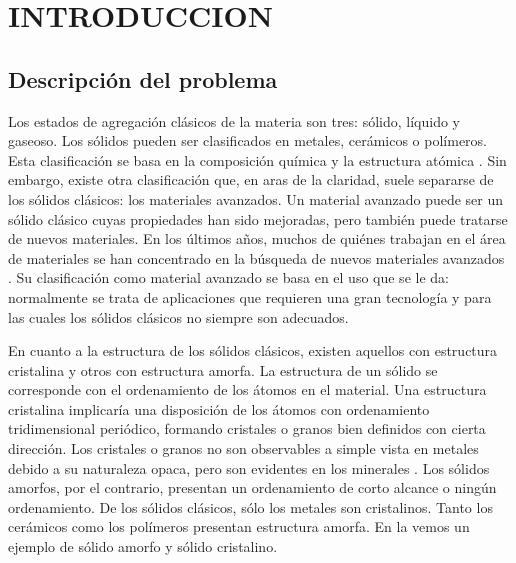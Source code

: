 
\chapter{INTRODUCCION} %

\label{C1} %



\section{Descripción del problema}
\label{S1_1}

Los estados de agregación clásicos de la materia son tres: sólido, líquido y gaseoso. Los sólidos pueden ser clasificados en metales, cerámicos o polímeros. Esta clasificación se basa en la composición química y la estructura atómica \citep{callister95}. Sin embargo, existe otra clasificación que, en aras de la claridad, suele separarse de los sólidos clásicos: los materiales avanzados. Un material avanzado puede ser un sólido clásico cuyas propiedades han sido mejoradas, pero también puede tratarse de nuevos materiales. En los últimos años, muchos de quiénes trabajan en el área de materiales se han concentrado en la búsqueda de nuevos materiales avanzados \citep{suryana11}. Su clasificación como material avanzado se basa en el uso que se le da: normalmente se trata de aplicaciones que requieren una gran tecnología y para las cuales los sólidos clásicos no siempre son adecuados.

En cuanto a la estructura de los sólidos clásicos, existen aquellos con estructura cristalina y otros con estructura amorfa. La estructura de un sólido se corresponde con el ordenamiento de los átomos en el material. Una estructura cristalina implicaría una disposición de los átomos con ordenamiento tridimensional periódico, formando cristales o granos bien definidos con cierta dirección. Los cristales o granos no son observables a simple vista en metales debido a su naturaleza opaca, pero son evidentes en los minerales \citep{smith96}. Los sólidos amorfos, por el contrario, presentan un ordenamiento de corto alcance o ningún ordenamiento. De los sólidos clásicos, sólo los metales son cristalinos. Tanto los cerámicos como los polímeros presentan estructura amorfa. En la  vemos un ejemplo de sólido amorfo y sólido cristalino.

